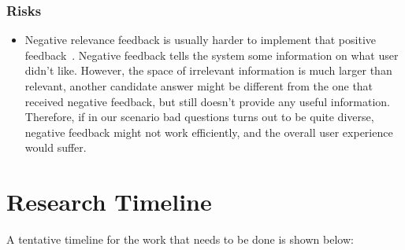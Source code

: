\subsubsection{Risks}
\label{section:proposal:plan:users:risks}

\begin{itemize}
\item Negative relevance feedback is usually harder to implement that positive feedback~\cite{wang2008study}.
Negative feedback tells the system some information on what user didn't like.
However, the space of irrelevant information is much larger than relevant, \ie another candidate answer might be different from the one that received negative feedback, but still doesn't provide any useful information.
Therefore, if in our scenario bad questions turns out to be quite diverse, negative feedback might not work efficiently, and the overall user experience would suffer.
\end{itemize}

\section{Research Timeline}
\label{section:proposal:timeline}

A tentative timeline for the work that needs to be done is shown below:

